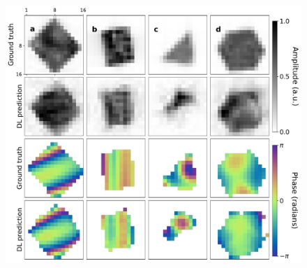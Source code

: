 \begin{figure}[H]
    \centering
    \includegraphics[width=\textwidth]{figures/Phasing/central_patch_highstrain_obj.pdf}
    \caption{}
    \label{fig:central_highstrain_obj}
\end{figure}

